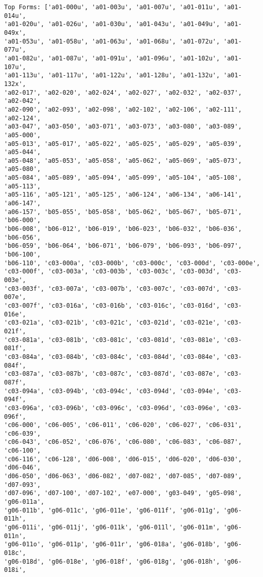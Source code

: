 \documentclass[11pt]{article}
\begin{document}
    \begin{Verbatim}[commandchars=\\\{\}]
Top Forms: ['a01-000u', 'a01-003u', 'a01-007u', 'a01-011u', 'a01-014u',
'a01-020u', 'a01-026u', 'a01-030u', 'a01-043u', 'a01-049u', 'a01-049x',
'a01-053u', 'a01-058u', 'a01-063u', 'a01-068u', 'a01-072u', 'a01-077u',
'a01-082u', 'a01-087u', 'a01-091u', 'a01-096u', 'a01-102u', 'a01-107u',
'a01-113u', 'a01-117u', 'a01-122u', 'a01-128u', 'a01-132u', 'a01-132x',
'a02-017', 'a02-020', 'a02-024', 'a02-027', 'a02-032', 'a02-037', 'a02-042',
'a02-090', 'a02-093', 'a02-098', 'a02-102', 'a02-106', 'a02-111', 'a02-124',
'a03-047', 'a03-050', 'a03-071', 'a03-073', 'a03-080', 'a03-089', 'a05-000',
'a05-013', 'a05-017', 'a05-022', 'a05-025', 'a05-029', 'a05-039', 'a05-044',
'a05-048', 'a05-053', 'a05-058', 'a05-062', 'a05-069', 'a05-073', 'a05-080',
'a05-084', 'a05-089', 'a05-094', 'a05-099', 'a05-104', 'a05-108', 'a05-113',
'a05-116', 'a05-121', 'a05-125', 'a06-124', 'a06-134', 'a06-141', 'a06-147',
'a06-157', 'b05-055', 'b05-058', 'b05-062', 'b05-067', 'b05-071', 'b06-000',
'b06-008', 'b06-012', 'b06-019', 'b06-023', 'b06-032', 'b06-036', 'b06-056',
'b06-059', 'b06-064', 'b06-071', 'b06-079', 'b06-093', 'b06-097', 'b06-100',
'b06-110', 'c03-000a', 'c03-000b', 'c03-000c', 'c03-000d', 'c03-000e',
'c03-000f', 'c03-003a', 'c03-003b', 'c03-003c', 'c03-003d', 'c03-003e',
'c03-003f', 'c03-007a', 'c03-007b', 'c03-007c', 'c03-007d', 'c03-007e',
'c03-007f', 'c03-016a', 'c03-016b', 'c03-016c', 'c03-016d', 'c03-016e',
'c03-021a', 'c03-021b', 'c03-021c', 'c03-021d', 'c03-021e', 'c03-021f',
'c03-081a', 'c03-081b', 'c03-081c', 'c03-081d', 'c03-081e', 'c03-081f',
'c03-084a', 'c03-084b', 'c03-084c', 'c03-084d', 'c03-084e', 'c03-084f',
'c03-087a', 'c03-087b', 'c03-087c', 'c03-087d', 'c03-087e', 'c03-087f',
'c03-094a', 'c03-094b', 'c03-094c', 'c03-094d', 'c03-094e', 'c03-094f',
'c03-096a', 'c03-096b', 'c03-096c', 'c03-096d', 'c03-096e', 'c03-096f',
'c06-000', 'c06-005', 'c06-011', 'c06-020', 'c06-027', 'c06-031', 'c06-039',
'c06-043', 'c06-052', 'c06-076', 'c06-080', 'c06-083', 'c06-087', 'c06-100',
'c06-116', 'c06-128', 'd06-008', 'd06-015', 'd06-020', 'd06-030', 'd06-046',
'd06-050', 'd06-063', 'd06-082', 'd07-082', 'd07-085', 'd07-089', 'd07-093',
'd07-096', 'd07-100', 'd07-102', 'e07-000', 'g03-049', 'g05-098', 'g06-011a',
'g06-011b', 'g06-011c', 'g06-011e', 'g06-011f', 'g06-011g', 'g06-011h',
'g06-011i', 'g06-011j', 'g06-011k', 'g06-011l', 'g06-011m', 'g06-011n',
'g06-011o', 'g06-011p', 'g06-011r', 'g06-018a', 'g06-018b', 'g06-018c',
'g06-018d', 'g06-018e', 'g06-018f', 'g06-018g', 'g06-018h', 'g06-018i',

\end{Verbatim}
\end{document}
